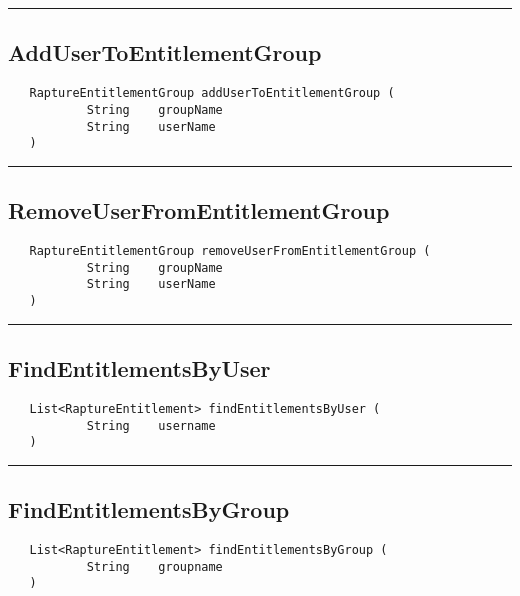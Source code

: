 \rule{15cm}{2pt}
\subsection{AddUserToEntitlementGroup}
\label{Api:AddUserToEntitlementGroup}
\begin{verbatim}
   RaptureEntitlementGroup addUserToEntitlementGroup (
           String    groupName
           String    userName
   )
\end{verbatim}



\rule{15cm}{2pt}
\subsection{RemoveUserFromEntitlementGroup}
\label{Api:RemoveUserFromEntitlementGroup}
\begin{verbatim}
   RaptureEntitlementGroup removeUserFromEntitlementGroup (
           String    groupName
           String    userName
   )
\end{verbatim}



\rule{15cm}{2pt}
\subsection{FindEntitlementsByUser}
\label{Api:FindEntitlementsByUser}
\begin{verbatim}
   List<RaptureEntitlement> findEntitlementsByUser (
           String    username
   )
\end{verbatim}



\rule{15cm}{2pt}
\subsection{FindEntitlementsByGroup}
\label{Api:FindEntitlementsByGroup}
\begin{verbatim}
   List<RaptureEntitlement> findEntitlementsByGroup (
           String    groupname
   )
\end{verbatim}



